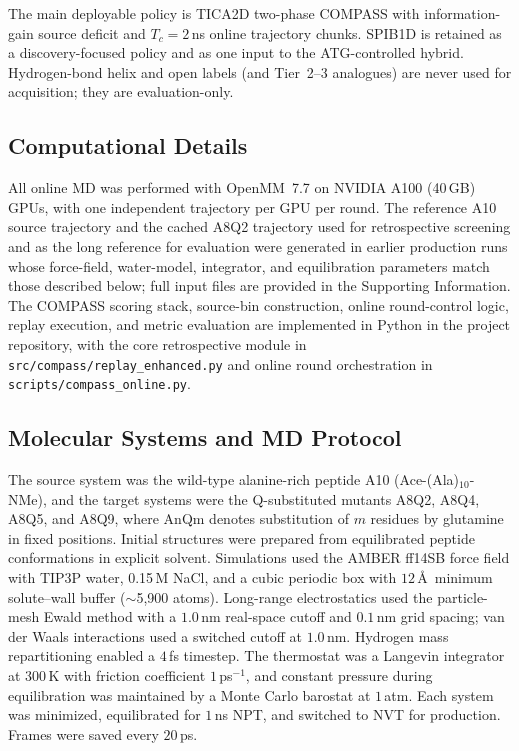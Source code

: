 \documentclass[journal=jctcce,manuscript=article,layout=twocolumn]{achemso}
\begin{document}
The main deployable policy is TICA2D two-phase COMPASS with information-gain source deficit and $T_c=2$\,ns online trajectory chunks. SPIB1D is retained as a discovery-focused policy and as one input to the ATG-controlled hybrid. Hydrogen-bond helix and open labels (and Tier~2--3 analogues) are never used for acquisition; they are evaluation-only.

\subsection{Computational Details}

All online MD was performed with OpenMM~7.7\cite{eastman2017openmm} on NVIDIA A100 (40\,GB) GPUs, with one independent trajectory per GPU per round. The reference A10 source trajectory and the cached A8Q2 trajectory used for retrospective screening and as the long reference for evaluation were generated in earlier production runs whose force-field, water-model, integrator, and equilibration parameters match those described below; full input files are provided in the Supporting Information. The COMPASS scoring stack, source-bin construction, online round-control logic, replay execution, and metric evaluation are implemented in Python in the project repository, with the core retrospective module in \texttt{src/compass/replay\_enhanced.py} and online round orchestration in \texttt{scripts/compass\_online.py}.

\subsection{Molecular Systems and MD Protocol}

The source system was the wild-type alanine-rich peptide A10 (Ace-(Ala)$_{10}$-NMe), and the target systems were the Q-substituted mutants A8Q2, A8Q4, A8Q5, and A8Q9, where AnQm denotes substitution of $m$ residues by glutamine in fixed positions. Initial structures were prepared from equilibrated peptide conformations in explicit solvent. Simulations used the AMBER ff14SB force field\cite{maier2015ff14sb} with TIP3P water,\cite{jorgensen1983tip3p} 0.15\,M NaCl, and a cubic periodic box with $12$\,\AA\ minimum solute--wall buffer ($\sim$5{,}900 atoms). Long-range electrostatics used the particle-mesh Ewald method with a $1.0$\,nm real-space cutoff and $0.1$\,nm grid spacing; van der Waals interactions used a switched cutoff at $1.0$\,nm. Hydrogen mass repartitioning enabled a $4$\,fs timestep. The thermostat was a Langevin integrator at $300$\,K with friction coefficient $1$\,ps$^{-1}$, and constant pressure during equilibration was maintained by a Monte Carlo barostat at $1$\,atm. Each system was minimized, equilibrated for $1$\,ns NPT, and switched to NVT for production. Frames were saved every $20$\,ps.
\end{document}
